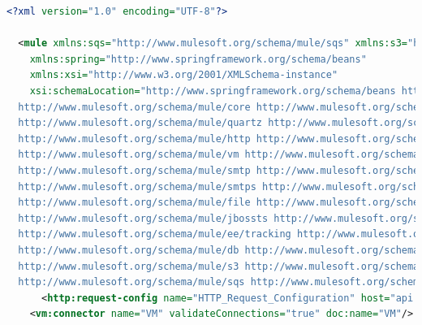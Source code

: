 \documentclass[a4paper,12pt]{article}
\begin{document}
\begin{lstlisting}[language=xml,caption=smart-rural.xml]
  <?xml version="1.0" encoding="UTF-8"?>

  <mule xmlns:sqs="http://www.mulesoft.org/schema/mule/sqs" xmlns:s3="http://www.mulesoft.org/schema/mule/s3" xmlns:db="http://www.mulesoft.org/schema/mule/db" xmlns:tracking="http://www.mulesoft.org/schema/mule/ee/tracking" xmlns:jbossts="http://www.mulesoft.org/schema/mule/jbossts" xmlns:file="http://www.mulesoft.org/schema/mule/file" xmlns:smtps="http://www.mulesoft.org/schema/mule/smtps" xmlns:smtp="http://www.mulesoft.org/schema/mule/smtp" xmlns:vm="http://www.mulesoft.org/schema/mule/vm" xmlns:http="http://www.mulesoft.org/schema/mule/http" xmlns:quartz="http://www.mulesoft.org/schema/mule/quartz" xmlns="http://www.mulesoft.org/schema/mule/core" xmlns:doc="http://www.mulesoft.org/schema/mule/documentation"
    xmlns:spring="http://www.springframework.org/schema/beans" 
    xmlns:xsi="http://www.w3.org/2001/XMLSchema-instance"
    xsi:schemaLocation="http://www.springframework.org/schema/beans http://www.springframework.org/schema/beans/spring-beans-current.xsd
  http://www.mulesoft.org/schema/mule/core http://www.mulesoft.org/schema/mule/core/current/mule.xsd
  http://www.mulesoft.org/schema/mule/quartz http://www.mulesoft.org/schema/mule/quartz/current/mule-quartz.xsd
  http://www.mulesoft.org/schema/mule/http http://www.mulesoft.org/schema/mule/http/current/mule-http.xsd
  http://www.mulesoft.org/schema/mule/vm http://www.mulesoft.org/schema/mule/vm/current/mule-vm.xsd
  http://www.mulesoft.org/schema/mule/smtp http://www.mulesoft.org/schema/mule/smtp/current/mule-smtp.xsd
  http://www.mulesoft.org/schema/mule/smtps http://www.mulesoft.org/schema/mule/smtps/current/mule-smtps.xsd
  http://www.mulesoft.org/schema/mule/file http://www.mulesoft.org/schema/mule/file/current/mule-file.xsd
  http://www.mulesoft.org/schema/mule/jbossts http://www.mulesoft.org/schema/mule/jbossts/current/mule-jbossts.xsd
  http://www.mulesoft.org/schema/mule/ee/tracking http://www.mulesoft.org/schema/mule/ee/tracking/current/mule-tracking-ee.xsd
  http://www.mulesoft.org/schema/mule/db http://www.mulesoft.org/schema/mule/db/current/mule-db.xsd
  http://www.mulesoft.org/schema/mule/s3 http://www.mulesoft.org/schema/mule/s3/current/mule-s3.xsd
  http://www.mulesoft.org/schema/mule/sqs http://www.mulesoft.org/schema/mule/sqs/current/mule-sqs.xsd">
      <http:request-config name="HTTP_Request_Configuration" host="api.thingspeak.com" port="80" doc:name="HTTP Request Configuration"/>
    <vm:connector name="VM" validateConnections="true" doc:name="VM"/>

\end{lstlisting}
\end{document}
